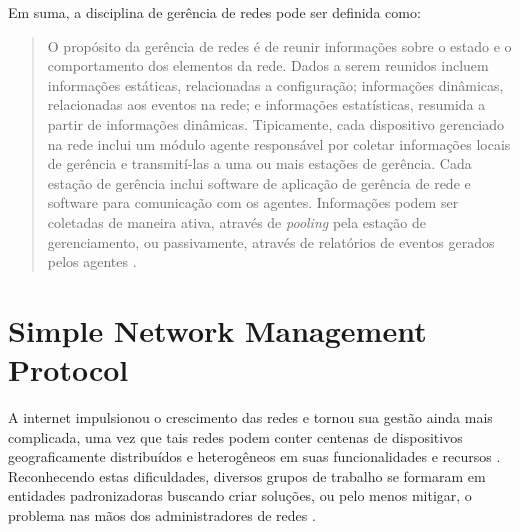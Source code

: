 \documentclass[twoside,english,brazilian]{UNISINOSmonografia}
\begin{document}
Em suma, a disciplina de gerência de redes pode ser definida como:

\begin{quote}
O propósito da gerência de redes é de reunir informações sobre o estado e o 
comportamento dos elementos da rede.
Dados a serem reunidos incluem informações estáticas, relacionadas a 
configuração; informações dinâmicas, relacionadas aos eventos na rede; e 
informações estatísticas, resumida a partir de informações dinâmicas.
Tipicamente, cada dispositivo gerenciado na rede inclui um módulo agente 
responsável por coletar informações locais de gerência e transmití-las a uma 
ou mais estações de gerência.
Cada estação de gerência inclui software de aplicação de gerência de rede e 
software para comunicação com os agentes.
Informações podem ser coletadas de maneira ativa, através de \textit{pooling} 
pela estação de gerenciamento, ou passivamente, através de relatórios de 
eventos gerados pelos agentes
\cite[p.~45]{stallings1999snmp}.
\end{quote}




\section{Simple Network Management Protocol}

A internet impulsionou o crescimento das redes e tornou sua gestão ainda mais 
complicada, uma vez que tais redes podem conter centenas de dispositivos 
geograficamente distribuídos e heterogêneos em suas funcionalidades e recursos
\cite{stallings1999snmp}.
Reconhecendo estas dificuldades, diversos grupos de trabalho se formaram em 
entidades padronizadoras buscando criar soluções, ou pelo menos mitigar, o 
problema nas mãos dos administradores de redes
\cite{Leinwand1996}.
\end{document}

